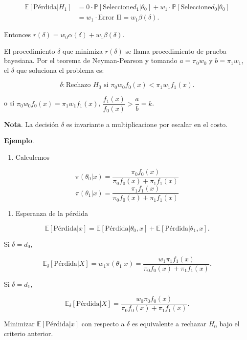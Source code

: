 \documentclass[
  12pt,
]{book}
\providecommand{\tightlist}{%
  \setlength{\itemsep}{0pt}\setlength{\parskip}{0pt}}
\begin{document}
\begin{align*}
\mathbb E[\text{Pérdida}|H_1] & = 0\cdot \mathbb P[\text{Seleccione} d_1|\theta_0] + w_1\cdot \mathbb P[\text{Seleccione} d_0|\theta_0]\\
& = w_1 \cdot \text{Error II} = w_1\beta(\delta).
\end{align*}

Entonces \(r(\delta) = w_0\alpha(\delta) + w_1\beta(\delta)\).

El procedimiento \(\delta\) que minimiza \(r(\delta)\) se llama procedimiento de prueba bayesiana. Por el teorema de Neyman-Pearson y tomando \(a=\pi_0w_0\) y \(b=\pi_1w_1\), el \(\delta\) que soluciona el problema es:

\[\delta: \text{Rechazo }H_0 \text{ si } \pi_0w_0f_0(x) < \pi_1w_1f_1(x). \]

o si \(\pi_0w_0f_0(x) = \pi_1w_1f_1(x)\), \(\dfrac{f_1(x)}{f_0(x)} > \dfrac ab = k\).

\textbf{Nota}. La decisión \(\delta\) es invariante a multiplicacione por escalar en el costo.

\textbf{Ejemplo}.

\begin{enumerate}
\def\labelenumi{\alph{enumi}.}
\tightlist
\item
  Calculemos
\end{enumerate}

\[\pi(\theta_0|x) = \dfrac{\pi_0f_0(x)}{\pi_0f_0(x)+\pi_1f_1(x)}\]
\[\pi(\theta_1|x) = \dfrac{\pi_1f_1(x)}{\pi_0f_0(x)+\pi_1f_1(x)}\]

\begin{enumerate}
\def\labelenumi{\alph{enumi}.}
\setcounter{enumi}{1}
\tightlist
\item
  Esperanza de la pérdida
\end{enumerate}

\[\mathbb E[\text{Pérdida}|x] = \mathbb E[\text{Pérdida}|\theta_0,x] + \mathbb E[\text{Pérdida}|\theta_1,x].\]

Si \(\delta = d_0\),

\[\mathbb E_\delta[\text{Pérdida}|X] = w_1\pi(\theta_1|x) =  \dfrac{w_1\pi_1f_1(x)}{\pi_0f_0(x)+\pi_1f_1(x)}. \]

Si \(\delta = d_1\),

\[\mathbb E_\delta[\text{Pérdida}|X] = \dfrac{w_0\pi_0f_0(x)}{\pi_0f_0(x)+\pi_1f_1(x)}. \]

Minimizar \(\mathbb E[\text{Pérdida}|x]\) con respecto a \(\delta\) es equivalente a rechazar \(H_0\) bajo el criterio anterior.
\end{document}
